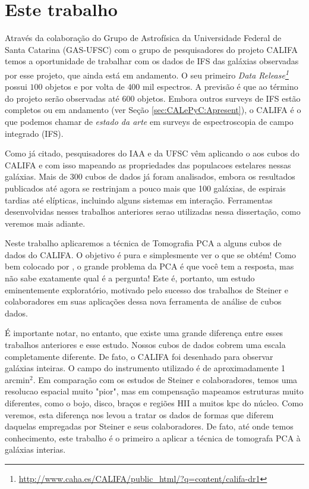 \section{Este trabalho}
\label{sec:Intro:ThisWork}

Através da colaboração do Grupo de Astrofísica da Universidade Federal de Santa Catarina (GAS-UFSC) com o grupo de
pesquisadores do projeto CALIFA temos a oportunidade de trabalhar com os dados de IFS das galáxias observadas por esse
projeto, que ainda está em andamento. O seu primeiro {\em Data
Release\footnote{\url{http://www.caha.es/CALIFA/public_html/?q=content/califa-dr1}}} \citep[][DR1]{Husemann2013} possui
$100$ objetos e por volta de $400$ mil espectros. A previsão é que ao término do projeto serão observadas até $600$
objetos. Embora outros surveys de IFS estão completos ou em andamento (ver Seção \ref{sec:CALePyC:Apresent}), o CALIFA é
o que podemos chamar de {\em estado da arte} em surveys de espectroscopia de campo integrado (IFS).

Como já citado, pesquisadores do IAA e da UFSC vêm aplicando o \starlight aos cubos do CALIFA e com isso mapeando as
propriedades das populacoes estelares nessas galáxias. Mais de 300 cubos de dados já foram analisados, embora os
resultados publicados até agora se restrinjam a pouco mais que 100 galáxias, de espirais tardias até elípticas,
incluindo alguns sistemas em interação. Ferramentas desenvolvidas nesses trabalhos anteriores serao utilizadas nessa
dissertação, como veremos mais adiante.

Neste trabalho aplicaremos a técnica de Tomografia PCA a alguns cubos de dados do CALIFA. O objetivo é pura e
simplesmente ver o que se obtém! Como bem colocado por \citet{Steiner2009}, o grande problema da PCA é que você tem a
resposta, mas não sabe exatamente qual é a pergunta! Este é, portanto, um estudo eminentemente exploratório, motivado
pelo sucesso dos trabalhos de Steiner e colaboradores em suas aplicações dessa nova ferramenta de análise de cubos
dados.

É importante notar, no entanto, que existe uma grande diferença entre esses trabalhos anteriores e esse estudo.  Nossos
cubos de dados cobrem uma escala completamente diferente. De fato, o CALIFA foi desenhado para observar galáxias
inteiras. O campo do instrumento utilizado é de aproximadamente 1 arcmin$^2$. Em comparação com os estudos de Steiner e
colaboradores, temos uma resolucao espacial muito "pior", mas em compensação mapeamos estruturas muito diferentes, como
o bojo, disco, braços e regiões HII a muitos kpc do núcleo. Como veremos, esta diferença nos levou a tratar os dados
de formas que diferem daquelas empregadas por Steiner e seus colaboradores. De fato, até onde temos conhecimento, este
trabalho é o primeiro a aplicar a técnica de tomografa PCA à galáxias interias.

